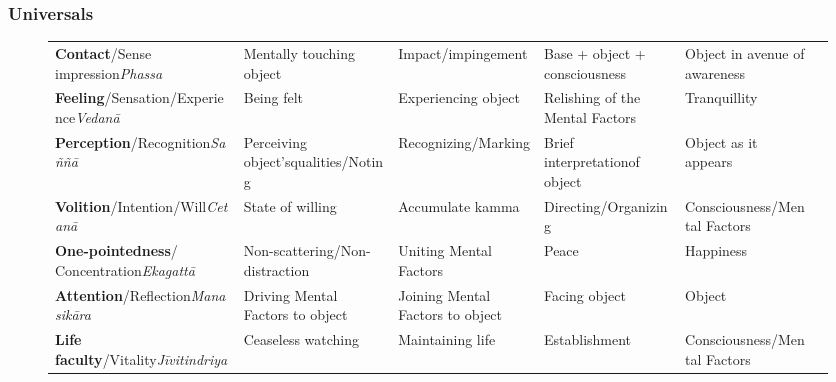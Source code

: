 \subsubsection*{Universals}

\begin{figure} [H]

\setlength{\tabcolsep}{0pt}
\renewcommand{\arraystretch}{1.1}

\noindent\begin{tabular}{P{0.25\textwidth} | C{.185\textwidth} C{0.185\textwidth} C{0.185\textwidth} C{0.195\textwidth} m{0mm}}
\toprule
 &  &  &  & \\
\midrule
\textbf{Contact}/\newline Sense impression\newline \textit{Phassa} & Mentally touching object & Impact/\newline impingement & Base + object + consciousness & Object in avenue of awareness &\\[12mm]
\textbf{Feeling}/\newline Sensation/Experience\newline \textit{Vedanā} & Being felt & Experiencing object & Relishing of the Mental Factors & Tranquillity &\\[12mm]
\textbf{Perception}/\newline Recognition\newline \textit{Saññā} & Perceiving object’s\newline qualities/Noting & Recognizing/\newline Marking & Brief interpretation\newline of object & Object as it appears &\\[12mm]
\textbf{Volition}/\newline Intention/Will\newline \textit{Cetanā} & State of willing & Accumulate kamma & Directing/\newline Organizing & Consciousness/\newline Mental Factors &\\[12mm]
\textbf{One-pointedness}/ Concentration\newline \textit{Ekagattā} & Non-scattering/\newline Non-distraction & Uniting Mental Factors & Peace & Happiness &\\[12mm]
\textbf{Attention}/\newline Reflection\newline \textit{Manasikāra} & Driving Mental Factors to object & Joining Mental Factors to object & Facing object & Object &\\[12mm]
\textbf{Life faculty}/\newline Vitality\newline \textit{Jīvitindriya} & Ceaseless watching & Maintaining life & Establishment & Consciousness/\newline Mental Factors &\\[12mm]
\bottomrule
\end{tabular} 


\end{figure}
